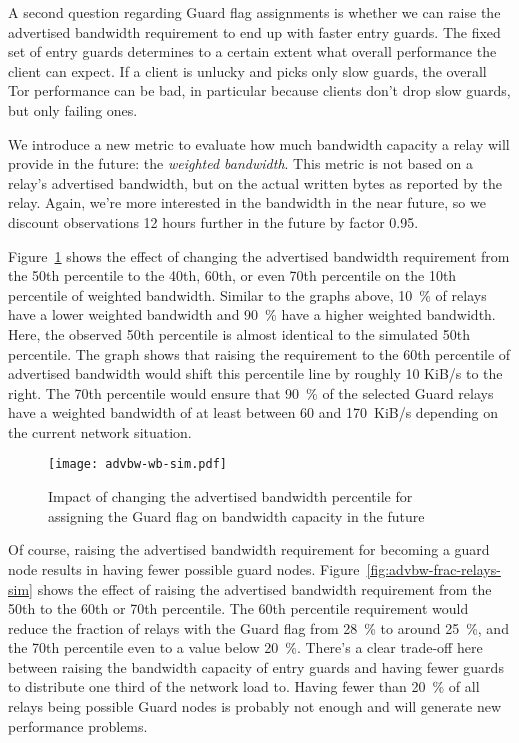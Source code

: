 \documentclass{article}
\begin{document}
A second question regarding Guard flag assignments is whether we can raise
the advertised bandwidth requirement to end up with faster entry guards.
The fixed set of entry guards determines to a certain extent what overall
performance the client can expect.
If a client is unlucky and picks only slow guards, the overall Tor
performance can be bad, in particular because clients don't drop slow
guards, but only failing ones.

We introduce a new metric to evaluate how much bandwidth capacity a relay
will provide in the future: the \emph{weighted bandwidth}.
This metric is not based on a relay's advertised bandwidth, but on the
actual written bytes as reported by the relay.
Again, we're more interested in the bandwidth in the near future, so we
discount observations 12 hours further in the future by factor 0.95.

Figure~\ref{fig:advbw-wb-sim} shows the effect of changing the advertised
bandwidth requirement from the 50th percentile to the 40th, 60th, or even
70th percentile on the 10th percentile of weighted bandwidth.
Similar to the graphs above, 10~\% of relays have a lower weighted
bandwidth and 90~\% have a higher weighted bandwidth.
Here, the observed 50th percentile is almost identical to the simulated
50th percentile.
The graph shows that raising the requirement to the 60th percentile of
advertised bandwidth would shift this percentile line by roughly 10 KiB/s
to the right.
The 70th percentile would ensure that 90~\% of the selected
Guard relays have a weighted bandwidth of at least between 60 and
170~KiB/s depending on the current network situation.

\begin{figure}[t]
\texttt{[image: advbw-wb-sim.pdf]}
\caption{Impact of changing the advertised bandwidth percentile for
assigning the Guard flag on bandwidth capacity in the future}
\label{fig:advbw-wb-sim}
\end{figure}

Of course, raising the advertised bandwidth requirement for becoming a
guard node results in having fewer possible guard nodes.
Figure~\ref{fig:advbw-frac-relays-sim} shows the effect of raising the
advertised bandwidth requirement from the 50th to the 60th or 70th
percentile.
The 60th percentile requirement would reduce the fraction of relays with
the Guard flag from 28~\% to around 25~\%, and the 70th percentile even to
a value below 20~\%.
There's a clear trade-off here between raising the bandwidth capacity of
entry guards and having fewer guards to distribute one third of the
network load to.
Having fewer than 20~\% of all relays being possible Guard nodes is
probably not enough and will generate new performance problems.
\end{document}
